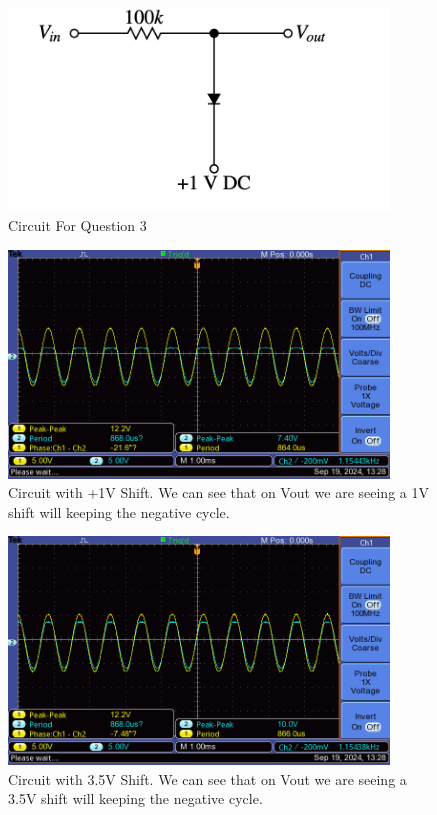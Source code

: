 \documentclass{article}
\begin{document}
\begin{figure}[H]
    \centering
    \includegraphics[width=0.9\textwidth]{./img/other/Lab4_3.png}
    \caption{Circuit For Question 3}
    \label{fig:graph7}
\end{figure}

\begin{figure}[H]
    \centering
    \includegraphics[width=0.9\textwidth]{./img/Lab4_3_1v.png}
    \caption{Circuit with +1V Shift. We can see that on Vout we are seeing a 1V shift will keeping the negative cycle.} 
    \label{fig:graph8}
\end{figure}

\begin{figure}[H]
    \centering
    \includegraphics[width=0.9\textwidth]{./img/Lab4_3_3.5v.png}
    \caption{Circuit with 3.5V Shift. We can see that on Vout we are seeing a 3.5V shift will keeping the negative cycle.}
    \label{fig:graph9}
\end{figure}
\newline
\newline
\end{document}
